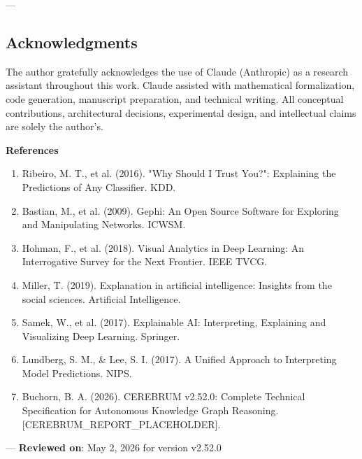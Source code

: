 ---
\subsection{Acknow\-ledgments}

The author gratefully ackno\-wledges the use of Claude (Anthropic) as a research assistant throughout this work. Claude assisted with mathe\-matical forma\-lization, code generation, manuscript preparation, and technical writing. All conceptual contr\-ibutions, archi\-tectural decisions, exper\-imental design, and intel\-lectual claims are solely the author's.

\textbf{References}
\begin{enumerate}
\item Ribeiro, M. T., et al. (2016). "Why Should I Trust You?": Explaining the Predictions of Any Classifier. KDD.
\item Bastian, M., et al. (2009). Gephi: An Open Source Software for Exploring and Manipu\-lating Networks. ICWSM.
\item Hohman, F., et al. (2018). Visual Analytics in Deep Learning: An Interr\-ogative Survey for the Next Frontier. IEEE TVCG.
\item Miller, T. (2019). Explanation in artificial intel\-ligence: Insights from the social sciences. Artificial Intell\-igence.
\item Samek, W., et al. (2017). Explainable AI: Interp\-reting, Explaining and Visualizing Deep Learning. Springer.
\item Lundberg, S. M., \& Lee, S. I. (2017). A Unified Approach to Interp\-reting Model Predictions. NIPS.
\item Buchorn, B. A. (2026). CEREBRUM v2.52.0: Complete Technical Specif\-ication for Autonomous Knowledge Graph Reasoning. [CEREBRUM\_REPORT\_PLACEHOLDER].

\end{enumerate}
---
\textbf{Reviewed on}: May 2, 2026 for version v2.52.0
